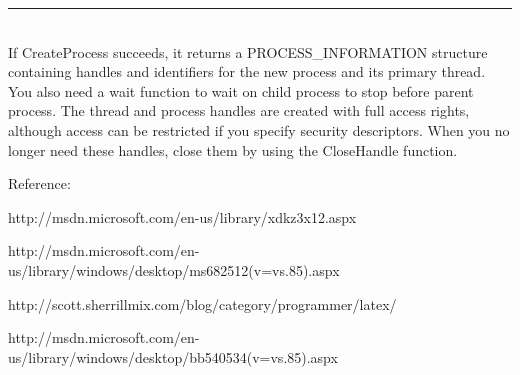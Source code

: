 \documentclass[letterpaper,12pt,titlepage]{article}
\begin{document}
\noindent\rule{15.5cm}{0.4pt}\\
If CreateProcess succeeds, it returns a PROCESS\_INFORMATION structure containing handles and identifiers for the new process and its primary thread. You also need a wait function to wait on child process to stop before parent process. The thread and process handles are created with full access rights, although access can be restricted if you specify security descriptors. When you no longer need these handles, close them by using the CloseHandle function.\par
\par
Reference:\par
http://msdn.microsoft.com/en-us/library/xdkz3x12.aspx\par
http://msdn.microsoft.com/en-us/library/windows/desktop/ms682512(v=vs.85).aspx\par
http://scott.sherrillmix.com/blog/category/programmer/latex/\par
http://msdn.microsoft.com/en-us/library/windows/desktop/bb540534(v=vs.85).aspx
\end{document}
